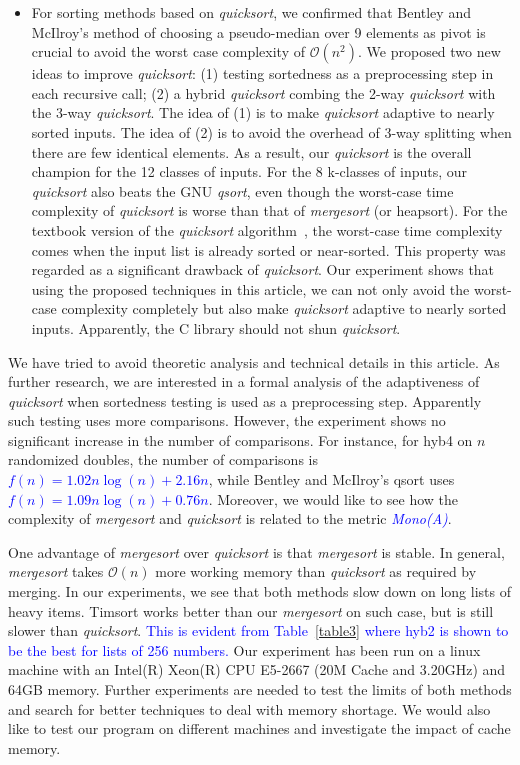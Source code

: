 \documentclass[AMA,STIX1COL]{WileyNJD-v2}
\newcommand {\mono}{\emph{\textcolor{blue}{Mono(A)}}}
\newcommand{\qusort}{\emph{quicksort }}
\newcommand{\qusortn}{\emph{quicksort}}
\newcommand{\qsortn}{\emph{qsort}}
\newcommand{\msort}{\emph{mergesort }}
\begin{document}
\begin{itemize}
\item For sorting methods based on \qusortn, we confirmed that Bentley and McIlroy’s method of choosing a pseudo-median over 9 elements as pivot is crucial to avoid the worst case complexity of $\mathcal{O}(n^2)$. 
We proposed two new ideas to improve \qusortn: (1) testing sortedness as a preprocessing step in each recursive call; (2) a hybrid \qusort combing the 2-way \qusort with the 3-way \qusortn. The idea of (1) is to make \qusort adaptive to nearly sorted inputs. The idea of (2) is to avoid the overhead of 3-way splitting when there are few identical elements. As a result, our \qusort is the overall champion for the 12 classes of inputs. For the 8 k-classes of inputs, our \qusort also beats the GNU \qsortn, even though the worst-case time complexity of \qusort is worse than that of \msort (or heapsort). For the textbook version of the \qusort algorithm~\cite{10.5555/1614191}, the worst-case time complexity comes when the input list is already sorted or near-sorted. This property was regarded as a significant drawback of \qusortn. Our experiment shows that using the proposed techniques in this article, we can not only avoid the worst-case complexity completely but also make \qusort adaptive to nearly sorted inputs. Apparently, the C library should not shun \qusortn.
\end{itemize}

We have tried to avoid theoretic analysis and technical details in this article. 
As further research, we are interested in a formal analysis of the adaptiveness of \qusort when sortedness testing is used as a preprocessing step. 
Apparently such testing uses more comparisons.  
However, the experiment shows no significant increase in the number of comparisons. 
For instance, for hyb4 on $n$ randomized doubles, the number of comparisons is \textcolor{blue}{$f(n) = 1.02n\log(n) + 2.16n$}, while Bentley and McIlroy’s qsort uses \textcolor{blue}{$f(n) = 1.09n\log(n) + 0.76n$}.  
Moreover, we would like to see how the complexity of \msort and \qusort is related to the metric \mono.

One advantage of \msort over \qusort is that \msort is stable. In general, \msort takes $\mathcal{O}(n)$ more working memory than \qusort as required by merging. 
In our experiments, we see that both methods slow down on long lists of heavy items. Timsort works better than our \msort on such case, but is still slower than \qusortn. 
\textcolor{blue}{This is evident from Table~\ref{table3} where hyb2 is shown to be the best for lists of 256 numbers.}
Our experiment has been run on a linux machine with an Intel(R) Xeon(R) CPU E5-2667 (20M Cache and 3.20GHz) and 64GB memory. 
Further experiments are needed to test the limits of both methods and search for better techniques to deal with memory shortage. 
We would also like to test our program on different machines and investigate the impact of cache memory. 
\end{document}
